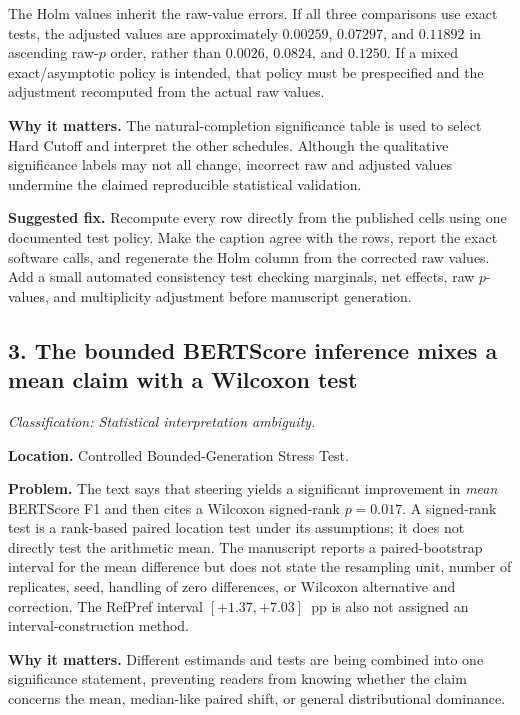 \documentclass[11pt]{article}
\newcommand{\findinglabel}[1]{\textbf{#1}}
\newcommand{\classification}[1]{\textit{Classification: #1.}}
\begin{document}
The Holm values inherit the raw-value errors.  If all three comparisons use exact tests, the adjusted values are approximately $0.00259$, $0.07297$, and $0.11892$ in ascending raw-$p$ order, rather than $0.0026$, $0.0824$, and $0.1250$.  If a mixed exact/asymptotic policy is intended, that policy must be prespecified and the adjustment recomputed from the actual raw values.

\findinglabel{Why it matters.} The natural-completion significance table is used to select Hard Cutoff and interpret the other schedules.  Although the qualitative significance labels may not all change, incorrect raw and adjusted values undermine the claimed reproducible statistical validation.

\findinglabel{Suggested fix.} Recompute every row directly from the published cells using one documented test policy.  Make the caption agree with the rows, report the exact software calls, and regenerate the Holm column from the corrected raw values.  Add a small automated consistency test checking marginals, net effects, raw $p$-values, and multiplicity adjustment before manuscript generation.

\subsection*{3. The bounded BERTScore inference mixes a mean claim with a Wilcoxon test}

\classification{Statistical interpretation ambiguity}

\findinglabel{Location.} Controlled Bounded-Generation Stress Test.

\findinglabel{Problem.} The text says that steering yields a significant improvement in \emph{mean} BERTScore F1 and then cites a Wilcoxon signed-rank $p=0.017$.  A signed-rank test is a rank-based paired location test under its assumptions; it does not directly test the arithmetic mean.  The manuscript reports a paired-bootstrap interval for the mean difference but does not state the resampling unit, number of replicates, seed, handling of zero differences, or Wilcoxon alternative and correction.  The RefPref interval $[+1.37,+7.03]$~pp is also not assigned an interval-construction method.

\findinglabel{Why it matters.} Different estimands and tests are being combined into one significance statement, preventing readers from knowing whether the claim concerns the mean, median-like paired shift, or general distributional dominance.
\end{document}
